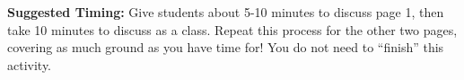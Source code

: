 \documentclass[noauthor,nooutcomes]{ximera}
\begin{document}
\begin{instructorNotes}
{\bf Suggested Timing:} Give students about 5-10 minutes to discuss page 1, then take 10 minutes to discuss as a class. Repeat this process for the other two pages, covering as much ground as you have time for! You do not need to ``finish'' this activity.


\end{instructorNotes}
\end{document}
